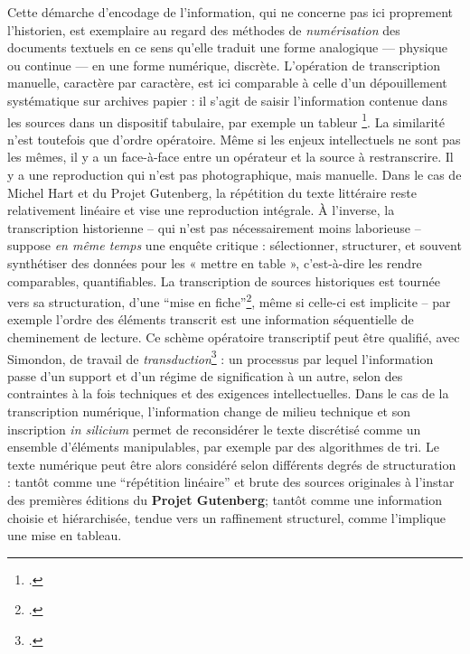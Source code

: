 Cette démarche d'encodage de l'information, qui ne concerne pas ici proprement l’historien, est exemplaire au regard des méthodes de \emph{numérisation} des documents textuels en ce sens qu’elle traduit une forme analogique — physique ou continue — en une forme numérique, discrète. L’opération de transcription manuelle, caractère par caractère, est ici comparable à celle d’un dépouillement systématique sur archives papier : il s’agit de saisir l’information contenue dans les sources dans un dispositif tabulaire, par exemple un tableur \footcite[][]{zalc}. La similarité n’est toutefois que d’ordre opératoire. Même si les enjeux intellectuels ne sont pas les mêmes, il y a un face-à-face entre un opérateur et la source à restranscrire. Il y a une reproduction qui n'est pas photographique, mais manuelle. Dans le cas de Michel Hart et du Projet Gutenberg, la répétition du texte littéraire reste relativement linéaire et vise une reproduction intégrale. À l’inverse, la transcription historienne -- qui n'est pas nécessairement moins laborieuse -- suppose \emph{en même temps} une enquête critique : sélectionner, structurer, et souvent synthétiser des données pour les « mettre en table », c’est-à-dire les rendre comparables, quantifiables. La transcription de sources historiques est tournée vers sa structuration, d'une \enquote{mise en fiche}\footcite[][]{bertfiche}, même si celle-ci est implicite -- par exemple l'ordre des éléments transcrit est une information séquentielle de cheminement de lecture. Ce schème opératoire transcriptif peut être qualifié, avec Simondon, de travail de \emph{transduction}\footcite[][p. 76]{chatonsky} : un processus par lequel l’information passe d’un support et d’un régime de signification à un autre, selon des contraintes à la fois techniques et des exigences intellectuelles. Dans le cas de la transcription numérique, l'information change de milieu technique et son inscription \emph{in silicium} permet de reconsidérer le texte discrétisé comme un ensemble d'éléments manipulables, par exemple par des algorithmes de tri. Le texte numérique peut être alors considéré selon différents degrés de structuration : tantôt comme une \enquote{répétition linéaire} et brute des sources originales à l'instar des premières éditions du \textbf{Projet Gutenberg}; tantôt comme une information choisie et hiérarchisée, tendue vers un raffinement structurel, comme l'implique une mise en tableau.

